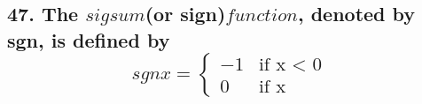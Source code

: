     \subsection*{47. The $sigsum$(or sign)$function$, denoted by sgn, is defined by $$sgn x = \left\{ \begin{array}{ll} -1 & \textrm{if x < 0} \\ 0 & \textrm{if x } \end{array} \right.$$}